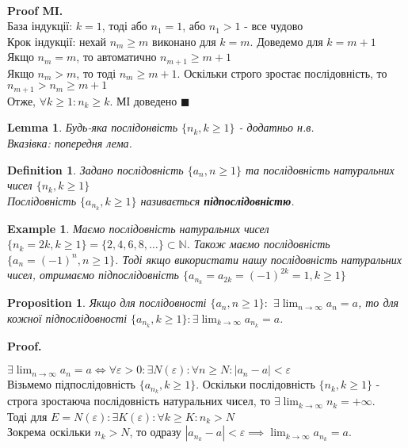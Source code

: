 \documentclass[a4paper, 14pt]{article}
\makeatletter
\def\qed{$\blacksquare$}
\theoremstyle{theoremdd}
\theoremstyle{theoremdd}
\newtheorem{definition}[theorem]{Definition}
\theoremstyle{theoremdd}
\theoremstyle{theoremdd}
\newtheorem{example}[theorem]{Example}
\theoremstyle{theoremdd}
\newtheorem{proposition}[theorem]{Proposition}
\theoremstyle{theoremdd}
\theoremstyle{theoremdd}
\newtheorem{lemma}[theorem]{Lemma}
\theoremstyle{theoremdd}
\renewenvironment{proof}[1][Proof.\\]{\par
\pushQED{\hfill \qed}%
\normalfont \topsep6\p@\@plus6\p@\relax
\trivlist
\item\relax
{\bfseries
#1\@addpunct{.}}\hspace\labelsep\ignorespaces
}{%
\popQED\endtrivlist\@endpefalse
}
\newenvironment{pfMI}{\vspace*{-3mm} \textbf{\\ Proof MI. \\}}{\hfill $\blacksquare$}
\makeatother
\begin{document}
	\begin{pfMI}
	База індукції: $k = 1$, тоді або $n_1 = 1$, або $n_1 > 1$ - все чудово\\
	Крок індукції: нехай $n_m \geq m$ виконано для $k=m$. Доведемо для $k=m+1$\\
	Якщо $n_m = m$, то автоматично $n_{m+1} \geq m+1$\\
	Якщо $n_m > m$, то тоді $n_m \geq m+1$. Оскільки строго зростає послідовність, то $n_{m+1} > n_m \geq m+1$\\
	Отже, $\forall k \geq 1: n_k \geq k$. МІ доведено
	\end{pfMI}
	
	\begin{lemma}
	Будь-яка послідонвість $\{n_k, k \geq 1\}$ - додатньо н.в.\\
	\textit{Вказівка: попередня лема.}
	\end{lemma}
	
	\begin{definition}
	Задано послідовність $\{a_n, n \geq 1\}$ та послідовність натуральних чисел $\{n_k, k \geq 1\}$\\
	Послідовність $\{a_{n_k}, k \geq 1\}$ називається \textbf{підпослідовністю}.
	\end{definition}
	
	\begin{example} Маємо послідовність натуральних чисел
	$\{n_k = 2k, k \geq 1 \} = \{2,4,6,8,\dots \} \subset \mathbb{N}$.
	Також маємо послідовність $\{a_n = (-1)^n, n \geq 1\}$. Тоді якщо використати нашу послідовність натуральних чисел, отримаємо підпослідовність $\{a_{n_k} = a_{2k} = (-1)^{2k} = 1, k \geq 1\}$
	\end{example}

	
	\begin{proposition}
	Якщо для послідовності $\{a_n, n \geq 1\}:$ $\displaystyle \exists \lim_{n \to \infty} a_n = a$, то для кожної підпослідовності $\displaystyle \{a_{n_k}, k \geq 1\}:\exists \lim_{k \to \infty} a_{n_k} = a$.
	\end{proposition}
	
	\begin{proof}
	$\displaystyle \exists \lim_{n \to \infty} a_n = a \iff \forall \varepsilon > 0: \exists N(\varepsilon): \forall n \geq N: |a_n-a| < \varepsilon$\\
	Візьмемо підпослідовність $\{a_{n_k}, k \geq 1\}$. Оскільки послідовність $\{n_k, k \geq 1\}$ - строга зростаюча послідовність натуральних чисел, то $\exists \displaystyle \lim_{k \to \infty} n_k = +\infty$.\\
	Тоді для $E = N(\varepsilon): \exists K(\varepsilon): \forall k \geq K: n_k > N$\\
	Зокрема оскільки $n_k > N$, то одразу $|a_{n_k} - a| < \varepsilon \implies \displaystyle \lim_{k \to \infty} a_{n_k} = a$.
	\end{proof}
	
\end{document}
